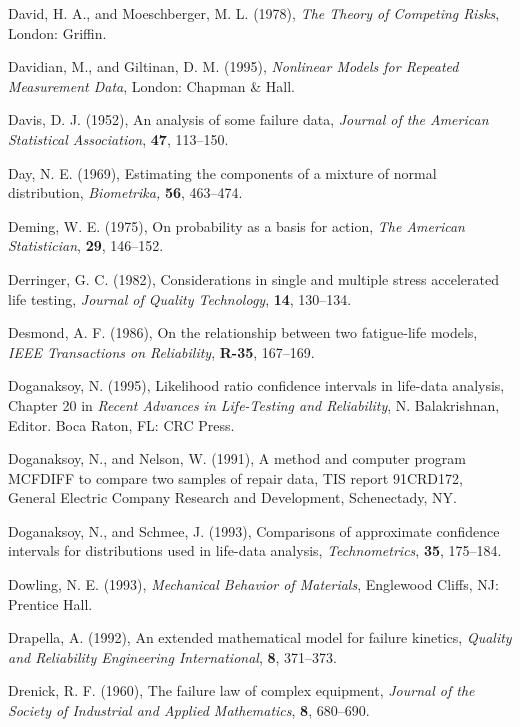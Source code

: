 \begin{thebibliography}{999}
David, H. A., and Moeschberger, M. L. (1978), {\em The Theory of Competing
Risks}, London: Griffin.

Davidian, M., and Giltinan, D. M. (1995), {\em Nonlinear Models for
Repeated Measurement Data}, London: Chapman \&  Hall.

Davis, D. J. (1952), An analysis of some failure data, {\em Journal of
the American Statistical Association}, {\bf 47}, 113--150.

Day, N. E. (1969), Estimating the components of a mixture of normal
distribution, {\em Biometrika, } {\bf 56}, 463--474.

Deming, W. E. (1975), On probability as a basis for action, {\em The
American Statistician}, {\bf 29}, 146--152.

Derringer, G. C. (1982), Considerations in single and multiple
stress accelerated life testing, {\em Journal of Quality
Technology}, {\bf 14}, 130--134.

Desmond, A. F. (1986), On the relationship between two fatigue-life
models, {\em IEEE Transactions on Reliability}, {\bf R-35}, 167--169.

Doganaksoy, N.  (1995), Likelihood ratio confidence intervals in
life-data analysis, Chapter 20 in {\em Recent Advances in
Life-Testing and Reliability}, N. Balakrishnan, Editor.  Boca Raton,
FL: CRC Press.

Doganaksoy, N., and Nelson, W. (1991), A method and computer program
MCFDIFF to compare two samples of repair data, TIS report 91CRD172,
General Electric Company Research and Development, Schenectady, NY.

Doganaksoy, N.,  and Schmee, J. (1993), Comparisons of approximate
confidence intervals for distributions used in life-data analysis,
{\em Technometrics}, {\bf 35}, 175--184.

Dowling, N. E. (1993), {\em Mechanical Behavior of Materials},
Englewood Cliffs, NJ: Prentice Hall.

Drapella, A. (1992), An extended mathematical model for failure
kinetics, {\em Quality and Reliability Engineering International},
{\bf 8}, 371--373.

Drenick, R. F. (1960), The failure law of complex equipment, {\em
Journal of the Society of Industrial and Applied Mathematics}, {\bf
8}, 680--690.


\end{thebibliography}
